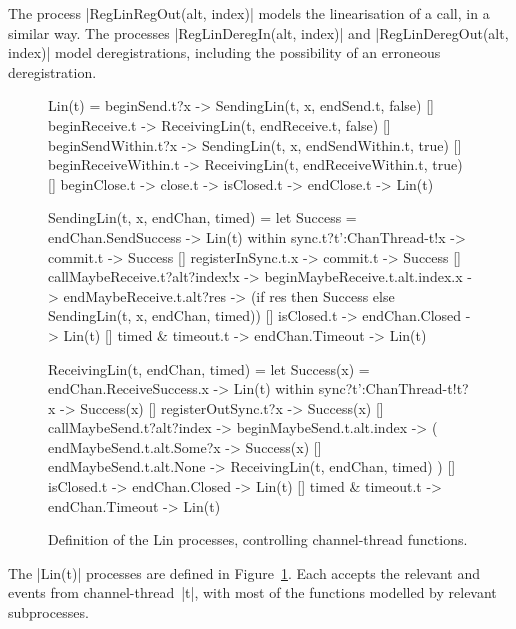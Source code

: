 The process |RegLinRegOut(alt, index)| models the linearisation of a
 call, in a similar way.  The processes
|RegLinDeregIn(alt, index)| and |RegLinDeregOut(alt, index)| model
deregistrations, including the possibility of an erroneous deregistration.


\begin{figure}
\begin{cspm}
Lin(t) = 
  beginSend.t?x -> SendingLin(t, x, endSend.t, false)
  [] beginReceive.t -> ReceivingLin(t, endReceive.t, false)
  [] beginSendWithin.t?x -> SendingLin(t, x, endSendWithin.t, true)
  [] beginReceiveWithin.t -> ReceivingLin(t, endReceiveWithin.t, true) 
  [] beginClose.t -> close.t -> isClosed.t -> endClose.t -> Lin(t)
  
SendingLin(t, x, endChan, timed) = 
  let Success = endChan.SendSuccess -> Lin(t) within
  sync.t?t':ChanThread-{t}!x -> commit.t -> Success
  []
  registerInSync.t.x -> commit.t -> Success
  []
  callMaybeReceive.t?alt?index!x -> beginMaybeReceive.t.alt.index.x -> 
    endMaybeReceive.t.alt?res -> 
    (if res then Success else SendingLin(t, x, endChan, timed))
  []
  isClosed.t -> endChan.Closed -> Lin(t)
  []
  timed & timeout.t -> endChan.Timeout -> Lin(t)
  
ReceivingLin(t, endChan, timed) =  
  let Success(x) = endChan.ReceiveSuccess.x -> Lin(t) within
  sync?t':ChanThread-{t}!t?x -> Success(x) 
  []
  registerOutSync.t?x -> Success(x) 
  []
  callMaybeSend.t?alt?index -> beginMaybeSend.t.alt.index -> (
    endMaybeSend.t.alt.Some?x -> Success(x) 
    [] endMaybeSend.t.alt.None -> ReceivingLin(t, endChan, timed) )
  [] 
  isClosed.t -> endChan.Closed -> Lin(t)
  []
  timed & timeout.t -> endChan.Timeout -> Lin(t)
\end{cspm}
\caption{Definition of the {\scalashape Lin} processes, controlling
  channel-thread functions.  \label{fig:Lin}}
\end{figure}


The |Lin(t)| processes are defined in Figure~\ref{fig:Lin}.  Each accepts the
relevant  and  events from channel-thread~|t|, with
most of the functions modelled by relevant subprocesses.

